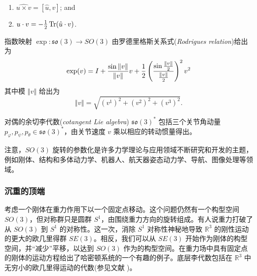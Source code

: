 \documentclass[11pt,fontset=founder]{ctexart}
\begin{document}
\begin{enumerate}
\item $\widehat{u\times v}=[\hat{u},v]$; and

\item $u\cdot v=-\frac{1}{2}\mathop{\rm Tr}(\hat{u}\cdot v)$.
\end{enumerate}

指数映射 $\exp :\mathfrak{so}(3)\rightarrow SO(3)$ 由罗德里格斯关系式(\emph{Rodrigues relation})给出为
\begin{equation*}
\exp (v)=I+\frac{\sin \left\Vert v\right\Vert }{\left\Vert v\right\Vert }v+%
\frac{1}{2}\left( \frac{\sin \frac{\left\Vert v\right\Vert }{2}}{\frac{%
\left\Vert v\right\Vert }{2}}\right) ^{2}v^{2}
\end{equation*}
其中模 $\left\Vert v\right\Vert $ 给出为
\begin{equation*}
\left\Vert v\right\Vert =\sqrt{(v^{1})^{2}+(v^{2})^{2}+(v^{3})^{2}}.
\end{equation*}

对偶的余切李代数(\emph{cotangent Lie algebra}) $\mathfrak{so}(3)^{\ast }$ 包括三个关节角动量 $p_{\varphi },p_{\psi },p_{\theta}\in \mathfrak{so}(3)^{\ast }$，由关节速度 $v$ 乘以相应的转动惯量得出。

注意，$SO(3)$ 旋转的参数化是许多力学理论与应用领域不断研究和开发的主题，例如刚体、结构和多体动力学、机器人、航天器姿态动力学、导航、图像处理等领域。

\subsubsection{沉重的顶端}

考虑一个刚体在重力作用下以一个固定点移动。这个问题仍然有一个构型空间 $SO(3)$，但对称群只是圆群 $S^{1}$，由围绕重力方向的旋转组成。有人说重力打破了从 $SO(3)$ 到 $S^{1}$ 的对称性。这一次，消除 $S^{1}$ 对称性神秘地导致 $\mathbb{R}^{3}$ 的刚性运动的更大的欧几里得群 $SE(3)$。相反，我们可以从 $SE(3)$ 开始作为刚体的构型空间，并“减少”平移，以达到 $SO(3)$ 作为的构型空间。在重力场中具有固定点的刚体的运动方程给出了哈密顿系统的一个有趣的例子。底层李代数包括在 $\mathbb{R}^{3}$ 中无穷小的欧几里得运动的代数(参见文献 \cite{Arnold,Abraham,GaneshSprBig,GaneshADG})。
\end{document}
